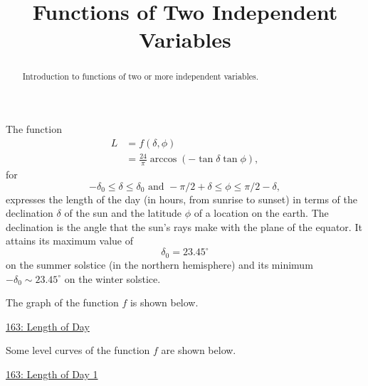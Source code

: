 \documentclass{ximera}
\title{Functions of Two Independent Variables}
\begin{document}
\begin{abstract}
Introduction to functions of two or more independent variables.
\end{abstract}
\maketitle


\begin{example} \label{Edft45346t34}
The function
\begin{align*}
      L &= f(\delta, \phi) \\
         & = \frac{24}{\pi}\arccos\left( -\tan \delta \tan \phi  \right) , 
\end{align*}
for
\[
             -\delta_0 \leq \delta \leq \delta_0 \text{ and } -\pi/2+\delta \leq \phi \leq \pi/2-\delta ,
\]
expresses the length of the day (in hours, from sunrise to sunset) in terms of the declination $\delta$ of the sun and the latitude $\phi$ of a location on the earth. The declination is the angle that the sun's rays make with the plane of the equator. It attains its maximum value of 
\[
   \delta_0 = 23.45^\circ
\]
on the summer solstice (in the northern hemisphere) and its minimum $-\delta_0 \sim 23.45^\circ$ on the winter solstice.

The graph of the function $f$ is shown below.

\begin{onlineOnly}
    \begin{center}
\end{center}
\end{onlineOnly}

\href{https://www.desmos.com/3d/kzyp9rm9i2}{163: Length of Day}


Some level curves of the function $f$ are shown below.

\begin{onlineOnly}
    \begin{center}
\end{center}
\end{onlineOnly}

\href{https://www.desmos.com/calculator/skdmdgnui1}{163: Length of Day 1}



\end{example}
\end{document}
